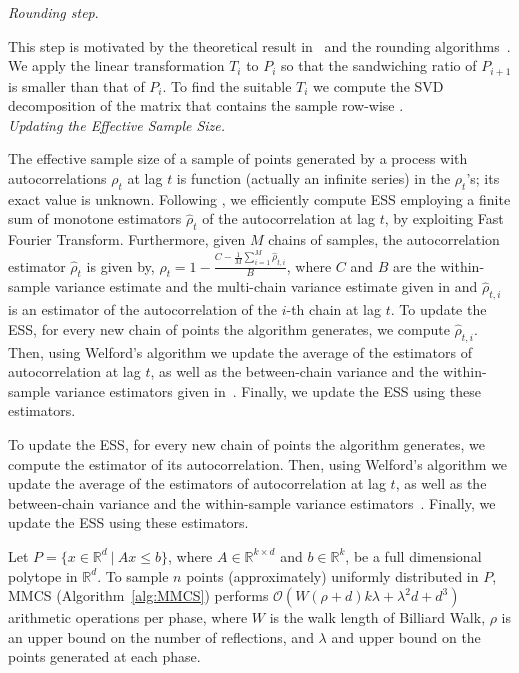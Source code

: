    \emph{Rounding step}. 

   This step is motivated by the theoretical result in~\citep{Adamczak10} and the rounding
   algorithms~\citep{Lovasz06, Cousins15}.
   We apply the linear transformation $T_i$ to $P_i$
   so that the sandwiching ratio of $P_{i+1}$ is smaller than that of $P_i$.
   To find the suitable $T_i$ we compute  the SVD decomposition of the matrix that contains 
   the sample row-wise \citep{Shiri20}. \\
   
   \emph{Updating the  Effective Sample Size.}

   The effective sample size of a sample of points generated by a process with autocorrelations $\rho_t$ at lag $t$
   is function (actually an infinite series) in the $\rho_t$'s; its exact value is unknown.
   Following \citep{geyer92}, we efficiently compute ESS employing a finite sum of monotone estimators
   $\hat{\rho}_t$ of the autocorrelation at lag $t$, by exploiting Fast Fourier Transform. 
   Furthermore, given $M$ chains of samples, the autocorrelation estimator $\hat{\rho}_t$ is given by,
   $\hat{\rho}_t = 1 - \frac{C - \frac{1}{M}\sum_{i=1}^{M}\hat{\rho}_{t,i}}{B}$, 
   where $C$ and $B$ are the within-sample variance estimate and the multi-chain variance estimate given in \citep{Gelman92} and $\hat{\rho}_{t,i}$ is an estimator of the autocorrelation of the $i$-th chain at lag $t$.
   To update the ESS, for every new chain of points the algorithm generates, we compute
   $\hat{\rho}_{t,i}$. Then, using Welford's algorithm we
   update the average of the estimators of autocorrelation at lag $t$,
   as well as the between-chain variance and the within-sample variance estimators given in~\citep{Gelman92}.
   Finally, we update the ESS using these estimators.

   To update the ESS, for every new chain of points the algorithm generates, we compute
   the estimator of its autocorrelation. Then, using Welford's algorithm we
   update the average of the estimators of autocorrelation at lag $t$,
   as well as the between-chain variance and the within-sample variance estimators~\citep{Gelman92}.
   Finally, we update the ESS using these estimators.
   
   
   \begin{lem}
     \label{lem:mmcs_complexity}
     Let $P=\{x\in\mathbb{R}^d\ |\ Ax\leq b\}$, where $A\in\mathbb{R}^{k\times d}$ and
     $b\in\mathbb{R}^k$, be a full dimensional polytope in $\mathbb{R}^d$.
     To sample $n$ points  (approximately) uniformly distributed in $P$,
     MMCS (Algorithm~\ref{alg:MMCS}) performs
     $\mathcal{O}(W(\rho + d)k\lambda + \lambda^2d + d^3)$
     arithmetic operations per phase, where $W$ is the walk length
     of Billiard Walk,
     $\rho$ is an upper bound on the number of reflections, and $\lambda$
     and upper bound on the points generated at each phase.
   \end{lem}

